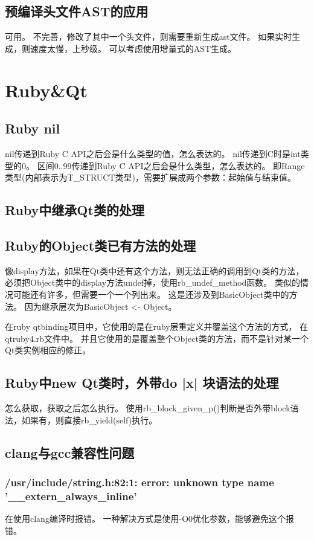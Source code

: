\section{预编译头文件AST的应用}
可用。
不完善，修改了其中一个头文件，则需要重新生成ast文件。
如果实时生成，则速度太慢，上秒级。
可以考虑使用增量式的AST生成。

\chapter{Ruby&Qt}
\section{Ruby nil}
nil传递到Ruby C API之后会是什么类型的值，怎么表达的。
nil传递到C时是int类型的0。
区间0..99传递到Ruby C API之后会是什么类型，怎么表达的。
即Range类型(内部表示为T\_STRUCT类型)，需要扩展成两个参数：起始值与结束值。

\section{Ruby中继承Qt类的处理}

\section{Ruby的Object类已有方法的处理}
像display方法，如果在Qt类中还有这个方法，则无法正确的调用到Qt类的方法，
必须把Object类中的display方法undef掉，使用rb\_undef\_method函数。
类似的情况可能还有许多，但需要一个一个列出来。
这是还涉及到BasicObject类中的方法。
因为继承层次为BasicObject <- Object。

在ruby qtbinding项目中，它使用的是在ruby层重定义并覆盖这个方法的方式，
在qtruby4.rb文件中。
并且它使用的是覆盖整个Object类的方法，而不是针对某一个Qt类实例相应的修正。

\section{Ruby中new Qt类时，外带do |x| 块语法的处理}
怎么获取，获取之后怎么执行。
使用rb\_block\_given\_p()判断是否外带block语法，如果有，则直接rb\_yield(self)执行。


\section{clang与gcc兼容性问题}
\subsection{/usr/include/string.h:82:1: error: unknown type name '\_\_extern\_always\_inline'}
在使用clang编译时报错。
一种解决方式是使用-O0优化参数，能够避免这个报错。

